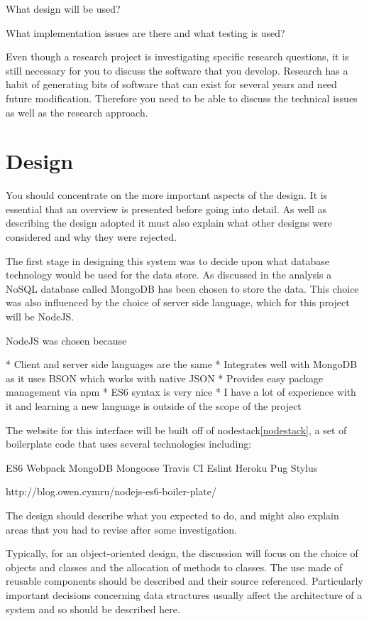 What design will be used?

What implementation issues are there and what testing is used? 

Even though a research project is investigating specific research questions, it is still necessary for you to discuss the software that you develop. Research has a habit of generating bits of software that can exist for several years and need future modification. Therefore you need to be able to discuss the technical issues as well as the research approach. 

\section{Design}
You should concentrate on the more important aspects of the design. It is essential that an overview is presented before going into detail. As well as describing the design adopted it must also explain what other designs were considered and why they were rejected.

The first stage in designing this system was to decide upon what database technology would be used for the data store. As discussed in the analysis a NoSQL database called MongoDB has been chosen to store the data. This choice was also influenced by the choice of server side language, which for this project will be NodeJS. 

NodeJS was chosen because 

* Client and server side languages are the same
* Integrates well with MongoDB as it uses BSON which works with native JSON
* Provides easy package management via npm
* ES6 syntax is very nice
* I have a lot of experience with it and learning a new language is outside of the scope of the project

The website for this interface will be built off of nodestack\ref{nodestack}, a set of boilerplate code that uses several technologies including:

ES6
Webpack
MongoDB
Mongoose
Travis CI
Eslint
Heroku
Pug
Stylus

http://blog.owen.cymru/nodejs-es6-boiler-plate/

The design should describe what you expected to do, and might also explain areas that you had to revise after some investigation.

Typically, for an object-oriented design, the discussion will focus on the choice of objects and classes and the allocation of methods to classes. The use made of reusable components should be described and their source referenced. Particularly important decisions concerning data structures usually affect the architecture of a system and so should be described here.

